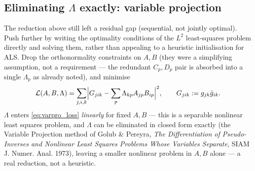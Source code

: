 \documentclass{article}
\begin{document}
\subsection{Eliminating $\Lambda$ exactly: variable projection}
\label{sec:varpro}

The reduction above still left a residual gap (sequential, not jointly optimal). Push further by
writing the optimality conditions of the $L^2$ least-squares problem directly and solving them,
rather than appealing to a heuristic initialisation for ALS. Drop the orthonormality constraints
on $A,B$ (they were a simplifying assumption, not a requirement — the redundant $C_p,D_p$ pair is
absorbed into a single $\Lambda_p$ as already noted), and minimise
\begin{equation}
    \mathcal{L}(A,B,\Lambda) = \sum_{j,i,k}\Bigl|G_{jik} - \sum_p \Lambda_{kp}A_{jp}B_{ip}\Bigr|^2,
    \qquad G_{jik} := g_{jk}\bar g_{ik}.
    \label{eq:varpro_loss}
\end{equation}
$\Lambda$ enters \eqref{eq:varpro_loss} \emph{linearly} for fixed $A,B$ — this is a separable
nonlinear least squares problem, and $\Lambda$ can be eliminated in closed form exactly (the
Variable Projection method of Golub \& Pereyra, \emph{The Differentiation of Pseudo-Inverses and
Nonlinear Least Squares Problems Whose Variables Separate}, SIAM J. Numer. Anal. 1973), leaving a
smaller nonlinear problem in $A,B$ alone — a real reduction, not a heuristic.
\end{document}
